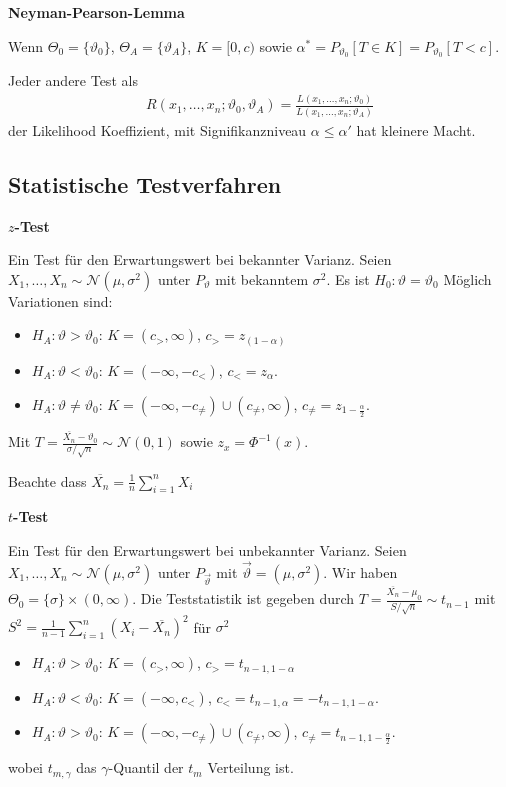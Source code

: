 \documentclass[25pt]{sciposter}
\newenvironment{method}[1]{\begin{mdframed}[backgroundcolor=blue!10,innertopmargin=15pt, innerbottommargin=15pt,nobreak=true]
		\textbf{#1 }
	}
	{ 
	\end{mdframed}
}
\newenvironment{thm}[1]{\begin{mdframed}[backgroundcolor=pink!20,innertopmargin=15pt, innerbottommargin=15pt, nobreak=true]
		\textbf{#1 }
	}
	{ 
	\end{mdframed}
}
\newcommand{\TODO}[1]{\todo[inline]{\Large TODO:  #1}}
\begin{document}
\begin{multicols}{3}
\TODO{add example}


\begin{thm}{Neyman-Pearson-Lemma}
	Wenn $\Theta_0 = \{\vartheta_0\}$, $\Theta_A = \{\vartheta_A\}$, $K = [0,c)$ sowie $\alpha^*= P_{\vartheta_0}[T\in K] = P_{\vartheta_0}[T < c]$.
	
	Jeder andere Test als 
	\begin{align*}
		R(x_1,\ldots,x_n;\vartheta_0, \vartheta_A) = \frac{L(x_1,\ldots,x_n;\vartheta_0)}{L(x_1,\ldots,x_n;\vartheta_A)}
	\end{align*}der Likelihood Koeffizient, mit Signifikanzniveau $\alpha \leq \alpha'$ hat kleinere Macht.
\end{thm}


\subsection*{Statistische Testverfahren}


\begin{method}{$z$-Test}
	Ein Test für den Erwartungswert bei bekannter Varianz. Seien $X_1,\ldots,X_n\sim \mathcal{N}(\mu,\sigma^2)$ unter $P_{\vartheta}$ mit bekanntem $\sigma^2$. Es ist $H_0 : \vartheta = \vartheta_0$ Möglich Variationen sind:
	\begin{itemize}
		\item $H_A: \vartheta > \vartheta_0$: $K = (c_>,\infty)$, $c_> = z_{(1-\alpha)}$
		\item $H_A: \vartheta < \vartheta_0$: $K = (-\infty,-c_<)$, $c_< = z_\alpha$.
		\item $H_A: \vartheta \neq \vartheta_0$: $K = (-\infty,-c_{\neq}) \cup (c_{\neq},\infty)$, $c_{\neq} = z_{1-\frac{\alpha}{2}}$.
	\end{itemize}
Mit $T=\frac{\overline{X_n}-\vartheta_0}{\sigma / \sqrt{n}} \sim \mathcal{N}(0,1)$ sowie $z_{x} = \Phi^{-1}(x)$.
\end{method}
Beachte dass $\overline{X_n} = \frac{1}{n} \sum_{i=1}^{n} X_i$

\begin{method}{$t$-Test}
	Ein Test für den Erwartungswert bei unbekannter Varianz. Seien $X_1,\ldots,X_n\sim \mathcal{N}(\mu,\sigma^2)$ unter $P_{\vec{\vartheta}}$ mit $\vec{\vartheta}=(\mu,\sigma^2)$. Wir haben $\Theta_0= \{\sigma\}\times(0,\infty)$. Die Teststatistik ist gegeben durch $T = \frac{\overline{X_n}- \mu_0}{S/\sqrt{n}} \sim t_{n-1}$ mit $S^2=\frac{1}{n-1}\sum_{i=1}^{n}\left(X_i-\overline{X_n}\right)^2$ für $\sigma^2$
	
	\begin{itemize}
		\item $H_A: \vartheta > \vartheta_0$: $K = (c_>,\infty)$, $c_> = t_{n-1,1-\alpha}$
		\item $H_A: \vartheta < \vartheta_0$: $K = (-\infty,c_<)$, $c_< = t_{n-1,\alpha} = -t_{n-1,1-\alpha}$.
		\item $H_A: \vartheta > \vartheta_0$: $K = (-\infty,-c_{\neq}) \cup (c_{\neq},\infty)$, $c_{\neq} = t_{n-1,1-\frac{\alpha}{2}}$.
	\end{itemize}
	wobei $t_{m,\gamma}$ das $\gamma$-Quantil der $t_m$ Verteilung ist.
\end{method}


\end{multicols}
\end{document}
